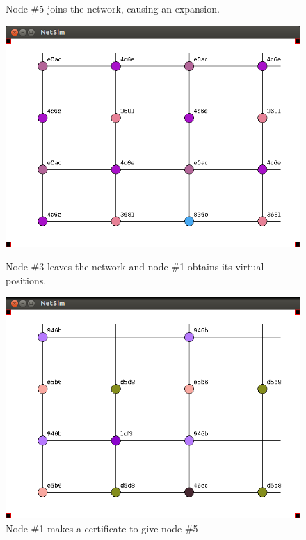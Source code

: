 \documentclass[ %
                    author={Luke Murray},
                supervisor={Dr. Simon Hollis},
                     title={Shadow Peer-to-Peer Networks},
                  subtitle={},
                    degree={MEng},
                      year={2013} ]{thesis}
\begin{document}
\begin{figure}[h]
\begin{minipage}[b]{0.45\linewidth}
        \caption{Node \#5 joins the network, causing an expansion.}
        \label{sim_balance2}
    \end{minipage}
    \begin{minipage}[b]{0.45\linewidth}
        \centering
        \includegraphics[width=\linewidth]{sim_pics/balance_6.png}
        \caption{Node \#3 leaves the network and node \#1 obtains its virtual positions.}
        \label{sim_balance3}
    \end{minipage}
    \hspace{0.5cm}
    \begin{minipage}[b]{0.45\linewidth}
        \centering
        \includegraphics[width=\linewidth]{sim_pics/expand_7.png}
        \caption{Node \#1 makes a certificate to give node \#5}
        \label{sim_balance4}
    \end{minipage}
\end{figure}
\end{document}
